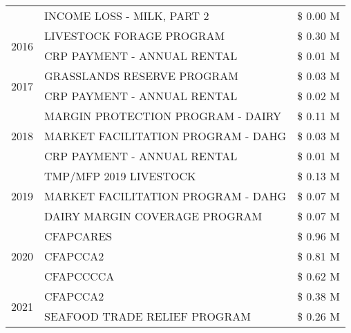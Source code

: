 \begin{tabular}{llr}
 & INCOME LOSS - MILK, PART 2 & \$ 0.00 M \\
\cline{1-3}
\multirow[t]{2}{*}{2016} & LIVESTOCK FORAGE PROGRAM & \$ 0.30 M \\
 & CRP PAYMENT - ANNUAL RENTAL & \$ 0.01 M \\
\cline{1-3}
\multirow[t]{2}{*}{2017} & GRASSLANDS RESERVE PROGRAM & \$ 0.03 M \\
 & CRP PAYMENT - ANNUAL RENTAL & \$ 0.02 M \\
\cline{1-3}
\multirow[t]{3}{*}{2018} & MARGIN PROTECTION PROGRAM - DAIRY & \$ 0.11 M \\
 & MARKET FACILITATION PROGRAM - DAHG & \$ 0.03 M \\
 & CRP PAYMENT - ANNUAL RENTAL & \$ 0.01 M \\
\cline{1-3}
\multirow[t]{3}{*}{2019} & TMP/MFP 2019 LIVESTOCK & \$ 0.13 M \\
 & MARKET FACILITATION PROGRAM - DAHG & \$ 0.07 M \\
 & DAIRY MARGIN COVERAGE PROGRAM & \$ 0.07 M \\
\cline{1-3}
\multirow[t]{3}{*}{2020} & CFAPCARES & \$ 0.96 M \\
 & CFAPCCA2 & \$ 0.81 M \\
 & CFAPCCCCA & \$ 0.62 M \\
\cline{1-3}
\multirow[t]{2}{*}{2021} & CFAPCCA2 & \$ 0.38 M \\
 & SEAFOOD TRADE RELIEF PROGRAM & \$ 0.26 M \\
\cline{1-3}
\bottomrule
\end{tabular}
